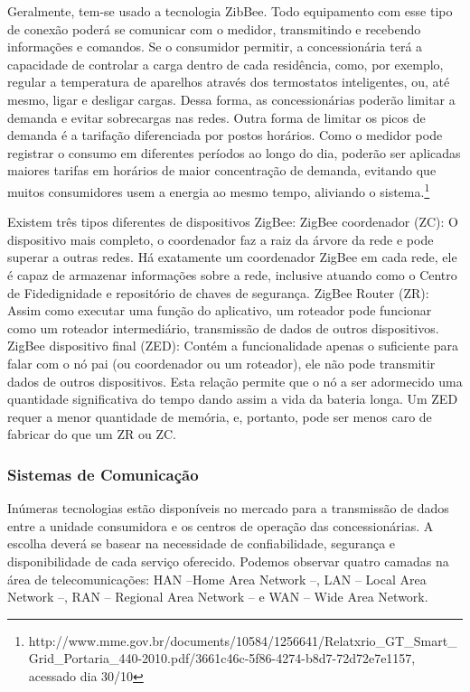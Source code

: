 	Geralmente, tem-se usado a tecnologia ZibBee. Todo equipamento com esse tipo de conexão poderá se comunicar com o medidor, transmitindo e recebendo informações e comandos. Se o consumidor permitir, a concessionária terá a capacidade de controlar a carga dentro de cada residência, como, por exemplo, regular a temperatura de aparelhos através dos termostatos inteligentes, ou, até mesmo, ligar e desligar cargas. Dessa forma, as concessionárias poderão limitar a demanda e evitar sobrecargas nas redes. Outra forma de limitar os picos de demanda é a tarifação diferenciada por postos horários. Como o medidor pode registrar o consumo em diferentes períodos ao longo do dia, poderão ser aplicadas maiores tarifas em horários de maior concentração de demanda, evitando que muitos consumidores usem a energia ao mesmo tempo, aliviando o sistema.\footnote{http://www.mme.gov.br/documents/10584/1256641/Relatxrio\_GT\_Smart\_Grid\_Portaria\_440-2010.pdf/3661c46c-5f86-4274-b8d7-72d72e7e1157, acessado dia 30/10}
	
	Existem três tipos diferentes de dispositivos ZigBee: ZigBee coordenador (ZC): O dispositivo mais completo, o coordenador faz a raiz da árvore da rede e pode superar a outras redes. Há exatamente um coordenador ZigBee em cada rede, ele é capaz de armazenar informações sobre a rede, inclusive atuando como o Centro de Fidedignidade e repositório de chaves de segurança. ZigBee Router (ZR): Assim como executar uma função do aplicativo, um roteador pode funcionar como um roteador intermediário, transmissão de dados de outros dispositivos. ZigBee dispositivo final (ZED): Contém a funcionalidade apenas o suficiente para falar com o nó pai (ou coordenador ou um roteador), ele não pode transmitir dados de outros dispositivos. Esta relação permite que o nó a ser adormecido uma quantidade significativa do tempo dando assim a vida da bateria longa. Um ZED requer a menor quantidade de memória, e, portanto, pode ser menos caro de fabricar do que um ZR ou ZC.
	
\subsubsection{Sistemas de Comunicação}

	Inúmeras tecnologias estão disponíveis no mercado para a transmissão de dados entre a unidade consumidora e os centros de operação das concessionárias. A escolha deverá se basear na necessidade de confiabilidade, segurança e disponibilidade de cada serviço oferecido. Podemos observar quatro camadas na área de telecomunicações: HAN –Home Area Network –, LAN – Local Area Network –, RAN – Regional Area Network – e WAN – Wide Area Network.
	
